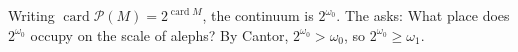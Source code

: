 Writing $\operatorname{card} \mathcal{P}(M) = 2^{\operatorname{card} M}$, the continuum is $2^{\omega_0}$. The  asks: What place does $2^{\omega_0}$ occupy on the scale of alephs? By Cantor, $2^{\omega_0} > \omega_0$, so $2^{\omega_0} \geqslant \omega_1$.
